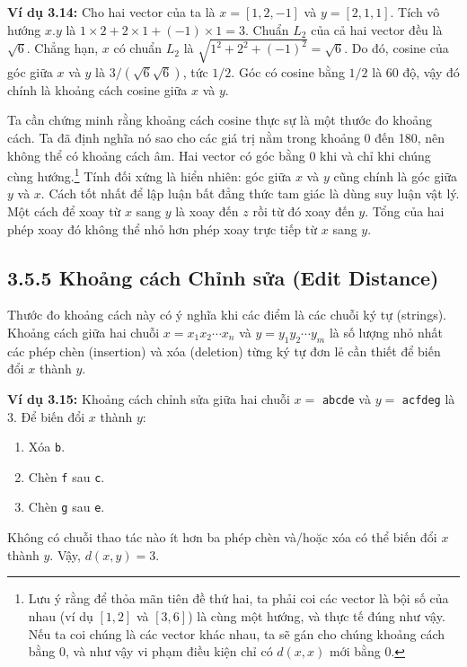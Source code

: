 \textbf{Ví dụ 3.14:} Cho hai vector của ta là $x = [1,2,-1]$ và $y = [2,1,1]$. Tích vô hướng $x.y$ là $1 \times 2 + 2 \times 1 + (-1) \times 1 = 3$. Chuẩn $L_2$ của cả hai vector đều là $\sqrt{6}$. Chẳng hạn, $x$ có chuẩn $L_2$ là $\sqrt{1^2+2^2+(-1)^2} = \sqrt{6}$. Do đó, cosine của góc giữa $x$ và $y$ là $3/(\sqrt{6}\sqrt{6})$, tức $1/2$. Góc có cosine bằng $1/2$ là 60 độ, vậy đó chính là khoảng cách cosine giữa $x$ và $y$.

Ta cần chứng minh rằng khoảng cách cosine thực sự là một thước đo khoảng cách. Ta đã định nghĩa nó sao cho các giá trị nằm trong khoảng 0 đến 180, nên không thể có khoảng cách âm. Hai vector có góc bằng 0 khi và chỉ khi chúng cùng hướng.\footnote{Lưu ý rằng để thỏa mãn tiên đề thứ hai, ta phải coi các vector là bội số của nhau (ví dụ $[1,2]$ và $[3,6]$) là cùng một hướng, và thực tế đúng như vậy. Nếu ta coi chúng là các vector khác nhau, ta sẽ gán cho chúng khoảng cách bằng 0, và như vậy vi phạm điều kiện chỉ có $d(x,x)$ mới bằng 0.} Tính đối xứng là hiển nhiên: góc giữa $x$ và $y$ cũng chính là góc giữa $y$ và $x$. Cách tốt nhất để lập luận bất đẳng thức tam giác là dùng suy luận vật lý. Một cách để xoay từ $x$ sang $y$ là xoay đến $z$ rồi từ đó xoay đến $y$. Tổng của hai phép xoay đó không thể nhỏ hơn phép xoay trực tiếp từ $x$ sang $y$.

\subsection*{3.5.5 Khoảng cách Chỉnh sửa (Edit Distance)}

Thước đo khoảng cách này có ý nghĩa khi các điểm là các chuỗi ký tự (strings). Khoảng cách giữa hai chuỗi $x = x_1x_2\cdots x_n$ và $y = y_1y_2\cdots y_m$ là số lượng nhỏ nhất các phép chèn (insertion) và xóa (deletion) từng ký tự đơn lẻ cần thiết để biến đổi $x$ thành $y$.

\textbf{Ví dụ 3.15:} Khoảng cách chỉnh sửa giữa hai chuỗi $x = $ \texttt{abcde} và $y = $ \texttt{acfdeg} là 3. Để biến đổi $x$ thành $y$:

\begin{enumerate}
  \item Xóa \texttt{b}.
  \item Chèn \texttt{f} sau \texttt{c}.
  \item Chèn \texttt{g} sau \texttt{e}.
\end{enumerate}

Không có chuỗi thao tác nào ít hơn ba phép chèn và/hoặc xóa có thể biến đổi $x$ thành $y$. Vậy, $d(x,y) = 3$.

